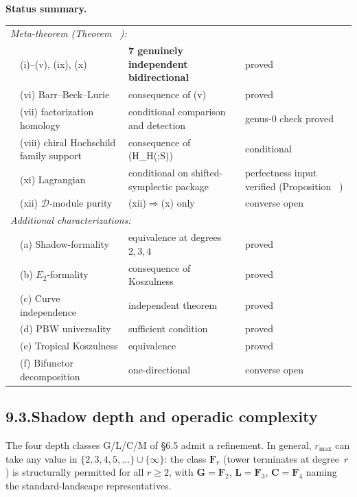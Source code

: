 \documentclass[11pt]{report}
\makeatletter
\theoremstyle{definition}
\theoremstyle{remark}
\providecommand{\cA}{\mathcal{A}}
\numberwithin{equation}{section}
\let\svy@oldref\ref
\renewcommand{\ref}[1]{%
 \@ifundefined{r@#1}{\textit{full monograph}}{\svy@oldref{#1}}%
}
\makeatother
\begin{document}
\medskip
\noindent\textbf{Status summary.}
\begin{center}
\renewcommand{\arraystretch}{1.15}
\begin{tabular}{clll}
\multicolumn{4}{l}{\emph{Meta-theorem
 \textup{(}Theorem~\ref{thm:koszul-equivalences-meta}\textup{)}:}}\\[2pt]
& (i)--(v), (ix), (x) & \textbf{7 genuinely independent bidirectional} & proved\\
& (vi) Barr--Beck--Lurie & consequence of (v) & proved\\
& (vii) factorization homology & conditional comparison and detection & genus-$0$ check proved\\
& (viii) chiral Hochschild family support & consequence of (H_H(\cA;S)) & conditional\\
& (xi) Lagrangian & conditional on shifted-symplectic package &
 perfectness input verified
 (Proposition~\ref{prop:lagrangian-perfectness})\\
& (xii) $\mathcal{D}$-module purity & (xii)$\Rightarrow$(x) only
 & converse open\\[4pt]
\multicolumn{4}{l}{\emph{Additional characterizations:}}\\[2pt]
& (a) Shadow-formality & equivalence at degrees $2,3,4$ & proved\\
& (b) $E_2$-formality & consequence of Koszulness & proved\\
& (c) Curve independence & independent theorem & proved\\
& (d) PBW universality & sufficient condition & proved\\
& (e) Tropical Koszulness & equivalence & proved\\
& (f) Bifunctor decomposition & one-directional & converse open
\end{tabular}
\end{center}

\subsection*{9.3.\quad Shadow depth and operadic complexity}

The four depth classes G/L/C/M of \S6.5 admit a refinement.
In general, $r_{\max}$ can take any value in
$\{2,3,4,5,\ldots\}\cup\{\infty\}$: the class $\mathbf{F}_r$
(tower terminates at degree~$r$) is structurally permitted for
all $r \geq 2$, with $\mathbf{G}=\mathbf{F}_2$,
$\mathbf{L}=\mathbf{F}_3$, $\mathbf{C}=\mathbf{F}_4$ naming the
standard-landscape representatives.
\end{document}
